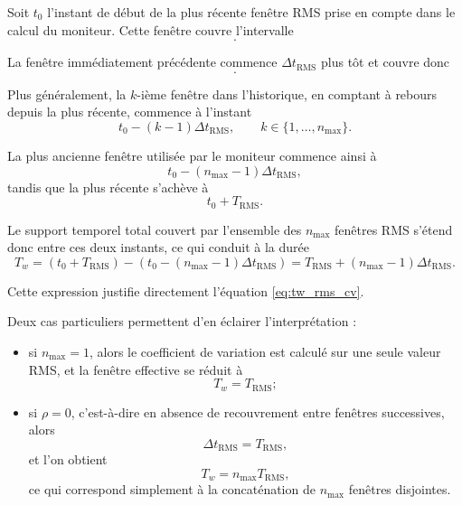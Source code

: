\documentclass[12pt,a4paper, openany]{book}
\begin{document}
Soit $t_0$ l'instant de début de la plus récente fenêtre RMS prise en compte dans le calcul du moniteur. Cette fenêtre couvre l'intervalle
\begin{equation}
[t_0,\; t_0 + T_{\mathrm{RMS}}].
\end{equation}

La fenêtre immédiatement précédente commence $\Delta t_{\mathrm{RMS}}$ plus tôt et couvre donc
\begin{equation}
[t_0 - \Delta t_{\mathrm{RMS}},\; t_0 - \Delta t_{\mathrm{RMS}} + T_{\mathrm{RMS}}].
\end{equation}

Plus généralement, la $k$-ième fenêtre dans l'historique, en comptant à rebours depuis la plus récente, commence à l'instant
\begin{equation}
t_0 - (k-1)\Delta t_{\mathrm{RMS}},
\qquad k \in \{1,\dots,n_{\max}\}.
\end{equation}

La plus ancienne fenêtre utilisée par le moniteur commence ainsi à
\begin{equation}
t_0 - (n_{\max}-1)\Delta t_{\mathrm{RMS}},
\end{equation}
tandis que la plus récente s'achève à
\begin{equation}
t_0 + T_{\mathrm{RMS}}.
\end{equation}

Le support temporel total couvert par l'ensemble des $n_{\max}$ fenêtres RMS s'étend donc entre ces deux instants, ce qui conduit à la durée
\begin{equation}
T_w
=
\left(t_0 + T_{\mathrm{RMS}}\right)
-
\left(t_0 - (n_{\max}-1)\Delta t_{\mathrm{RMS}}\right)
=
T_{\mathrm{RMS}} + (n_{\max}-1)\Delta t_{\mathrm{RMS}}.
\end{equation}

Cette expression justifie directement l'équation \eqref{eq:tw_rms_cv}.

Deux cas particuliers permettent d'en éclairer l'interprétation :
\begin{itemize}
    \item si $n_{\max}=1$, alors le coefficient de variation est calculé sur une seule valeur RMS, et la fenêtre effective se réduit à
    \begin{equation}
    T_w = T_{\mathrm{RMS}};
    \end{equation}
    \item si $\rho = 0$, c'est-à-dire en absence de recouvrement entre fenêtres successives, alors
    \begin{equation}
    \Delta t_{\mathrm{RMS}} = T_{\mathrm{RMS}},
    \end{equation}
    et l'on obtient
    \begin{equation}
    T_w = n_{\max}T_{\mathrm{RMS}},
    \label{eq:tw_disjoint}
    \end{equation}
    ce qui correspond simplement à la concaténation de $n_{\max}$ fenêtres disjointes.
\end{itemize}
    \medskip
\end{document}
